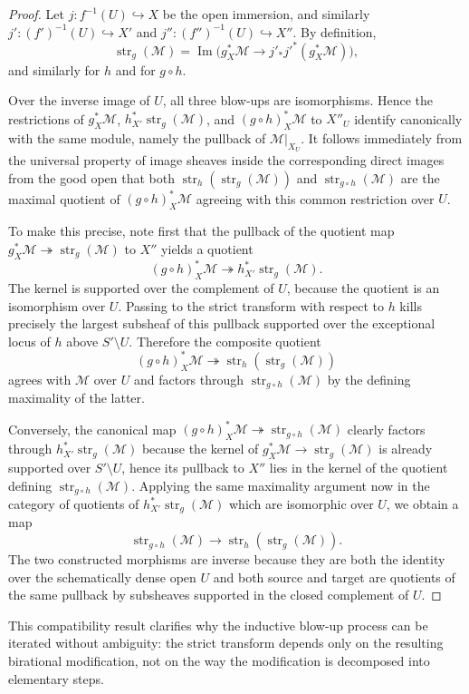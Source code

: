 \documentclass[11pt,oneside]{article}
\newcommand{\M}{\mathcal M}
\newcommand{\Image}{\operatorname{Im}}
\newcommand{\st}{\operatorname{str}}
\begin{document}
\begin{proof}
Let $j\colon f^{-1}(U)\hookrightarrow X$ be the open immersion, and similarly $j'\colon (f')^{-1}(U)\hookrightarrow X'$ and $j''\colon (f'')^{-1}(U)\hookrightarrow X''$.  By definition,
\[
\st_g(\M)=\Image\bigl(g_X^*\M\longrightarrow j'_*j'^*(g_X^*\M)\bigr),
\]
and similarly for $h$ and for $g\circ h$.

Over the inverse image of $U$, all three blow-ups are isomorphisms.  Hence the restrictions of $g_X^*\M$, $h_{X'}^*\st_g(\M)$, and $(g\circ h)_X^*\M$ to $X''_{U}$ identify canonically with the same module, namely the pullback of $\M|_{X_U}$.  It follows immediately from the universal property of image sheaves inside the corresponding direct images from the good open that both $\st_h(\st_g(\M))$ and $\st_{g\circ h}(\M)$ are the maximal quotient of $(g\circ h)_X^*\M$ agreeing with this common restriction over $U$.

To make this precise, note first that the pullback of the quotient map $g_X^*\M\twoheadrightarrow \st_g(\M)$ to $X''$ yields a quotient
\[
(g\circ h)_X^*\M\twoheadrightarrow h_{X'}^*\st_g(\M).
\]
The kernel is supported over the complement of $U$, because the quotient is an isomorphism over $U$.  Passing to the strict transform with respect to $h$ kills precisely the largest subsheaf of this pullback supported over the exceptional locus of $h$ above $S'\setminus U$.  Therefore the composite quotient
\[
(g\circ h)_X^*\M\twoheadrightarrow \st_h(\st_g(\M))
\]
agrees with $\M$ over $U$ and factors through $\st_{g\circ h}(\M)$ by the defining maximality of the latter.

Conversely, the canonical map $(g\circ h)_X^*\M\twoheadrightarrow \st_{g\circ h}(\M)$ clearly factors through $h_{X'}^*\st_g(\M)$ because the kernel of $g_X^*\M\to \st_g(\M)$ is already supported over $S'\setminus U$, hence its pullback to $X''$ lies in the kernel of the quotient defining $\st_{g\circ h}(\M)$.  Applying the same maximality argument now in the category of quotients of $h_{X'}^*\st_g(\M)$ which are isomorphic over $U$, we obtain a map
\[
\st_{g\circ h}(\M)\longrightarrow \st_h(\st_g(\M)).
\]
The two constructed morphisms are inverse because they are both the identity over the schematically dense open $U$ and both source and target are quotients of the same pullback by subsheaves supported in the closed complement of $U$.
\end{proof}

This compatibility result clarifies why the inductive blow-up process can be iterated without ambiguity: the strict transform depends only on the resulting birational modification, not on the way the modification is decomposed into elementary steps.
\end{document}
